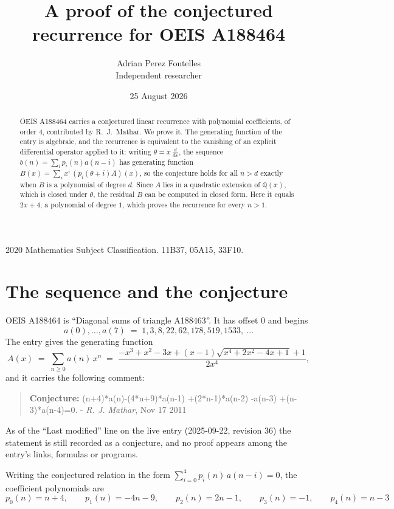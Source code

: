 \documentclass[11pt,a4paper]{article}
\title{A proof of the conjectured recurrence for OEIS A188464}
\author{Adrian Perez Fontelles\\ \small Independent researcher}
\date{25 August 2026}
\theoremstyle{plain}
\theoremstyle{definition}
\begin{document}
\maketitle

\begin{abstract}
OEIS A188464 carries a conjectured linear recurrence with polynomial coefficients, of
order 4, contributed by R.~J.~Mathar. We prove it. The generating function of the
entry is algebraic, and the recurrence is equivalent to the vanishing of an explicit
differential operator applied to it: writing $\theta=x\,\frac{d}{dx}$, the sequence
$b(n)=\sum_{i}p_{i}(n)a(n-i)$ has generating function
$B(x)=\sum_{i}x^{i}\,(p_{i}(\theta+i)A)(x)$, so the conjecture holds for all $n>d$ exactly
when $B$ is a polynomial of degree $d$. Since $A$ lies in a quadratic extension of
$\mathbb{Q}(x)$, which is closed under $\theta$, the residual $B$ can be computed in
closed form. Here it equals $2 x + 4$, a polynomial of degree $1$, which proves
the recurrence for every $n>1$.
\end{abstract}

\noindent\small 2020 Mathematics Subject Classification. 11B37, 05A15, 33F10.\normalsize

\section{The sequence and the conjecture}

OEIS A188464 is ``Diagonal sums of triangle A188463''. It has offset $0$ and begins
\[
a(0),\dots,a(7)\;=\;1, 3, 8, 22, 62, 178, 519, 1533,\ \dots
\]
The entry gives the generating function
\begin{equation}\label{eq:gf}
A(x)\;=\;\sum_{n\ge 0} a(n)\,x^{n}\;=\;\frac{- x^{3} + x^{2} - 3 x + \left(x - 1\right) \sqrt{x^{4} + 2 x^{2} - 4 x + 1} + 1}{2 x^{4}} ,
\end{equation}
and it carries the following comment:
\begin{quote}\small
\textbf{Conjecture:} (n+4)*a(n)-(4*n+9)*a(n-1) +(2*n-1)*a(n-2) -a(n-3) +(n-3)*a(n-4)=0. - \emph{R. J. Mathar}, Nov 17 2011
\end{quote}
As of the ``Last modified'' line on the live entry (2025-09-22, revision 36) the
statement is still recorded as a conjecture, and no proof appears among the entry's links,
formulas or programs.

Writing the conjectured relation in the form $\sum_{i=0}^{4}p_{i}(n)\,a(n-i)=0$,
the coefficient polynomials are
\[
p_{0}(n)=n + 4,\qquad p_{1}(n)=- 4 n - 9,\qquad p_{2}(n)=2 n - 1,\qquad p_{3}(n)=-1,\qquad p_{4}(n)=n - 3
\]
\end{document}
